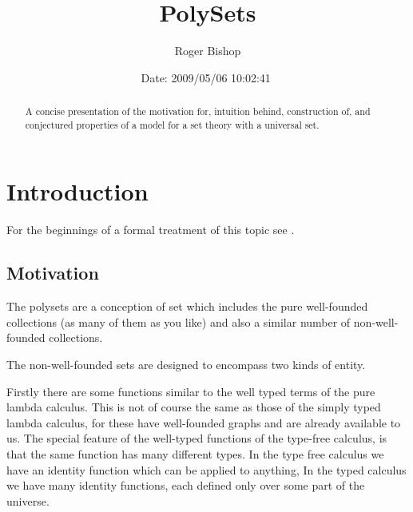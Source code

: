 \documentclass[numreferences]{rbjk}
\begin{document}
                                                                                   
\begin{article}
\begin{opening}  
\title{PolySets}
\author{Roger Bishop }
\date{$ $Date: 2009/05/06 10:02:41 $ $}

\begin{abstract}
A concise presentation of the motivation for, intuition behind, construction of, and conjectured properties of a model for a set theory with a universal set.
\end{abstract}
\end{opening}

\setcounter{tocdepth}{4}
{\parskip-0pt\tableofcontents}

\section{Introduction}

For the beginnings of a formal treatment of this topic see \cite{rbjt020}.

\subsection{Motivation}

The polysets are a conception of set which includes the pure well-founded collections (as many of them as you like) and also a similar number of non-well-founded collections.

The non-well-founded sets are designed to encompass two kinds of entity.

Firstly there are some functions similar to the well typed terms of the pure lambda calculus.
This is not of course the same as those of the simply typed lambda calculus, for these have well-founded graphs and are already available to us.
The special feature of the well-typed functions of the type-free calculus, is that the same function has many different types.
In the type free calculus we have an identity function which can be applied to anything,
In the typed calculus we have many identity functions, each defined only over some part of the universe.


\end{article}
\end{document}
